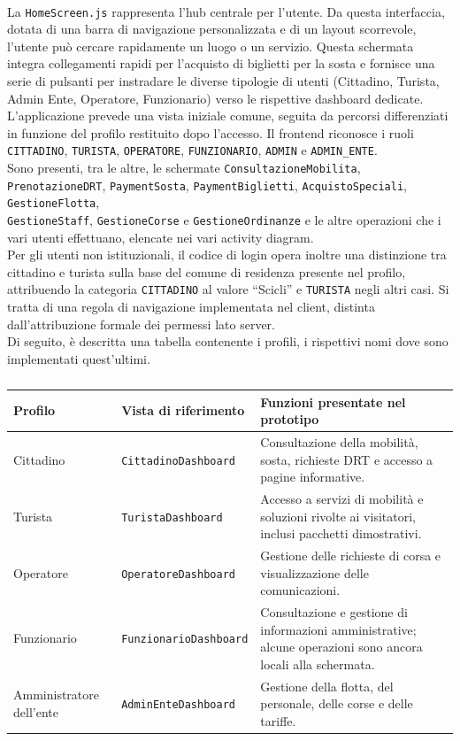 \\
La \texttt{HomeScreen.js} rappresenta l'hub centrale per l'utente. Da questa interfaccia, dotata di una barra di navigazione personalizzata e di un layout scorrevole, l'utente può cercare rapidamente un luogo o un servizio. Questa schermata integra collegamenti rapidi per l'acquisto di biglietti per la sosta e fornisce una serie di pulsanti per instradare le diverse tipologie di utenti (Cittadino, Turista, Admin Ente, Operatore, Funzionario) verso le rispettive dashboard dedicate.
\\
L'applicazione prevede una vista iniziale comune, seguita da percorsi differenziati in funzione del profilo restituito dopo l'accesso. Il frontend riconosce i ruoli \texttt{CITTADINO}, \texttt{TURISTA}, \texttt{OPERATORE}, \texttt{FUNZIONARIO}, \texttt{ADMIN} e \texttt{ADMIN\_ENTE}.
\\
Sono presenti, tra le altre, le schermate \texttt{ConsultazioneMobilita}, \texttt{PrenotazioneDRT}, \texttt{PaymentSosta}, \texttt{PaymentBiglietti}, \texttt{AcquistoSpeciali}, \texttt{GestioneFlotta}, 
\\\texttt{GestioneStaff}, \texttt{GestioneCorse} e \texttt{GestioneOrdinanze} e le altre operazioni che i vari utenti effettuano, elencate nei vari activity diagram. 
\\
Per gli utenti non istituzionali, il codice di login opera inoltre una distinzione tra cittadino e turista sulla base del comune di residenza presente nel profilo, attribuendo la categoria \texttt{CITTADINO} al valore ``Scicli'' e \texttt{TURISTA} negli altri casi. Si tratta di una regola di navigazione implementata nel client, distinta dall'attribuzione formale dei permessi lato server.
\\
Di seguito, è descritta una tabella contenente i profili, i rispettivi nomi dove sono implementati quest'ultimi.

\begin{table}[H]
\centering
\small
\begin{tabular}{P{3.0cm}P{5.0cm}P{6cm}}
\toprule
\textbf{Profilo} & \textbf{Vista di riferimento} & \textbf{Funzioni presentate nel prototipo}\\
\midrule
Cittadino & \texttt{CittadinoDashboard} & Consultazione della mobilità, sosta, richieste DRT e accesso a pagine informative.\\
Turista & \texttt{TuristaDashboard} & Accesso a servizi di mobilità e soluzioni rivolte ai visitatori, inclusi pacchetti dimostrativi.\\
Operatore & \texttt{OperatoreDashboard} & Gestione delle richieste di corsa e visualizzazione delle comunicazioni.\\
Funzionario & \texttt{FunzionarioDashboard} & Consultazione e gestione di informazioni amministrative; alcune operazioni sono ancora locali alla schermata.\\
Amministratore dell'ente & \texttt{AdminEnteDashboard} & Gestione della flotta, del personale, delle corse e delle tariffe.\\
\bottomrule
\end{tabular}
\caption{}
\label{tab:ruoli}
\end{table}

